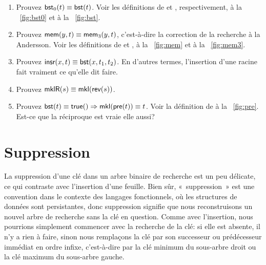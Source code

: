 \begin{enumerate}

  \item Prouvez \(\textsf{bst}_0(t) \equiv \textsf{bst}(t)\). Voir les
  définitions de  et
  , respectivement, à la
  \fig~\vref{fig:bst0} et à la \fig~\vref{fig:bst}.

  \item Prouvez \(\textsf{mem}(y,t) \equiv \textsf{mem}_3(y,t)\), c'est-à-dire
  la correction de la recherche à la Andersson. Voir les définitions
  de  et
  , à la
  \fig~\vref{fig:mem} et à la \fig~\vref{fig:mem3}.

  \item Prouvez \(\textsf{insr}(x,t) \equiv \textsf{bst}(x,t_1,t_2)\).
   En d'autres termes, l'insertion d'une
  racine fait vraiment ce qu'elle dit faire.

  \item Prouvez \(\textsf{mklR}(s) \equiv \textsf{mkl}(\textsf{rev}(s))\).
   

  \item Prouvez \(\textsf{bst}(t) \equiv \textsf{true}() \Rightarrow
  \textsf{mkl}(\textsf{pre}(t)) \equiv t\). Voir la définition de
    à la \fig~\vref{fig:pre}. Est-ce
  que la réciproque est vraie elle aussi?

\end{enumerate}

\section{Suppression}

La suppression d'une clé dans un arbre binaire de recherche est un peu
délicate, ce qui contraste avec l'insertion d'une feuille. Bien sûr,
«~suppression~» est une convention dans le contexte des langages
fonctionnels, où les structures de données sont persistantes, donc
suppression signifie que nous reconstruisons un nouvel arbre de
recherche sans la clé en question. Comme avec l'insertion, nous
pourrions simplement commencer avec la recherche de la clé: si elle
est absente, il n'y a rien à faire, sinon nous remplaçons la clé par
son successeur ou prédécesseur immédiat en ordre infixe, c'est-à-dire
par la clé minimum du sous-arbre droit ou la clé maximum du sous-arbre
gauche.

